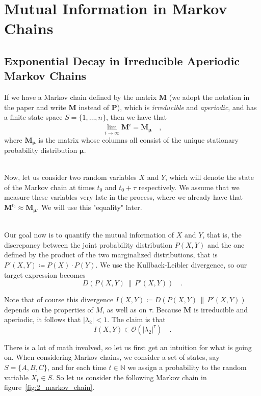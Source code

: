 \documentclass[../../main.tex]{subfiles}
\begin{document}
\section{Mutual Information in Markov Chains}
\subsection{Exponential Decay in Irreducible Aperiodic Markov Chains}
    \noindent
    If we have a Markov chain defined by the matrix $\boldsymbol{M}$ (we adopt the notation in the paper and write $\bm{M}$ instead of $\bm{P}$), which is \emph{irreducible} and \emph{aperiodic}, and has a finite state space $S = \{1, \dots, n\}$, then we have that
    \[
        \lim_{i \to \infty} \boldsymbol{M}^i = \boldsymbol{M}_{\boldsymbol{\mu}} \quad ,
    \]
    where $\boldsymbol{M_\mu}$ is the matrix whose columns all consist of the unique stationary probability distribution $\boldsymbol{\mu}$.

    ~\\
    Now, let us consider two random variables $X$ and $Y$, which will denote the state of the Markov chain at times $t_0$ and $t_0 + \tau$ respectively. We assume that we measure these variables very late in the process, where we already have that $\boldsymbol{M}^{t_0} \approx \boldsymbol{M}_{\boldsymbol{\mu}}$. We will use this "equality" later.

    ~\\
    Our goal now is to quantify the mutual information of $X$ and $Y$, that is, the discrepancy between the joint probability distribution $P(X, Y)$ and the one defined by the product of the two marginalized distributions, that is $P'(X, Y) \coloneqq P(X) \cdot P(Y)$. We use the Kullback-Leibler divergence, so our target expression becomes
    \[
        D(P(X, Y) \,\|\, P'(X, Y)) \quad .
    \]

    \smallskip \noindent
    Note that of course this divergence $I(X, Y) \coloneqq D(P(X, Y) \,\|\, P'(X, Y))$ depends on the properties of $M$, as well as on $\tau$. Because $\boldsymbol{M}$ is irreducible and aperiodic, it follows that $|\lambda_2| < 1$. The claim is that
    \[
        I(X, Y) \in \mathcal{O}(|\lambda_2|^\tau) \quad .
    \]
    
    \bigskip \noindent
    There is a lot of math involved, so let us first get an intuition for what is going on. When considering Markov chains, we consider a set of states, say $S = \{A, B, C\}$, and for each time $t \in \mathbb{N}$ we assign a probability to the random variable $X_t \in S$. So let us consider the following Markov chain in figure~\ref{fig:2_markov_chain}.
\end{document}
